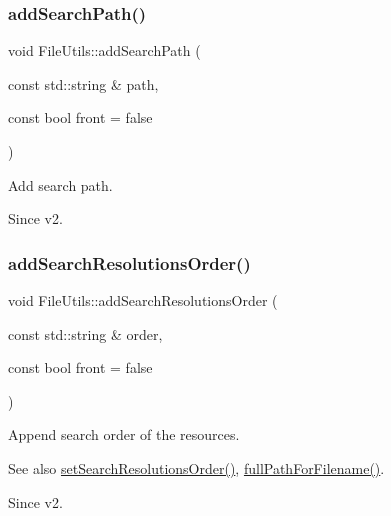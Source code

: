 \subsubsection{\texorpdfstring{add\+Search\+Path()}{addSearchPath()}\hspace{0.1cm}{\footnotesize\ttfamily [2/2]}}
{\footnotesize\ttfamily void File\+Utils\+::add\+Search\+Path (\begin{DoxyParamCaption}\item[{const std\+::string \&}]{path,  }\item[{const bool}]{front = {\ttfamily false} }\end{DoxyParamCaption})}

Add search path.

\begin{DoxySince}{Since}
v2. 
\end{DoxySince}
\mbox{\label{classFileUtils_a06551ef2a3f73686052fa91203d2a219}} 
\subsubsection{\texorpdfstring{add\+Search\+Resolutions\+Order()}{addSearchResolutionsOrder()}\hspace{0.1cm}{\footnotesize\ttfamily [1/2]}}
{\footnotesize\ttfamily void File\+Utils\+::add\+Search\+Resolutions\+Order (\begin{DoxyParamCaption}\item[{const std\+::string \&}]{order,  }\item[{const bool}]{front = {\ttfamily false} }\end{DoxyParamCaption})\hspace{0.3cm}{\ttfamily [virtual]}}

Append search order of the resources.

\begin{DoxySeeAlso}{See also}
\hyperlink{classFileUtils_ac99445fa3112510c8f019c9f38a4779f}{set\+Search\+Resolutions\+Order()}, \hyperlink{classFileUtils_a678409294ab5f13195b109e503f6a1df}{full\+Path\+For\+Filename()}. 
\end{DoxySeeAlso}
\begin{DoxySince}{Since}
v2. 
\end{DoxySince}
\mbox{\label{classFileUtils_a9fd27cac8efc54927ced6fb1b5f9f657}} 
